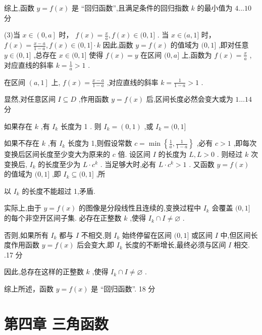 \documentclass[10pt]{article}
\begin{document}
综上,函数 \(y = f\left( x\right)\) 是 “回归函数”,且满足条件的回归指数 \(k\) 的最小值为 \(4\ldots {10}\) 分

(3)当 \(x \in  \left( {0,a}\right\rbrack\) 时， \(f\left( x\right)  = \frac{x}{a},f\left( x\right)  \in  (0,1\rbrack\) . 当 \(x \in  (a,1\rbrack\) 时， \(f\left( x\right)  = \frac{x - a}{1 - a},f\left( x\right)  \in  (0,1\rbrack  \cdot  k\) 因此,函数 \(y = f\left( x\right)\) 的值域为 \((0,1\rbrack\) ,即对任意 \(y \in  (0,1\rbrack\) ,总存在 \(x \in  (0,1\rbrack\) 使得 \(f\left( x\right)  = y\) 在区间 \((0,a\rbrack\) 上,函数为 \(f\left( x\right)  = \frac{x}{a}\) ,对应直线的斜率 \(k = \frac{1}{a} > 1\) .

在区间 \(\left( {a,1}\right\rbrack\) 上, \(f\left( x\right)  = \frac{x - a}{1 - a}\) ,对应直线的斜率 \(k = \frac{1}{1 - a} > 1\) .

显然,对任意区间 \(I \subseteq  D\) ,作用函数 \(y = f\left( x\right)\) 后,区间长度必然会变大或为 \(1\ldots {14}\) 分

如果存在 \(k\) ,有 \({I}_{k}\) 长度为 1 . 则 \({I}_{k} = \left( {0,1}\right)\) ,或 \({I}_{k} = (0,1\rbrack\)

如果不存在 \(k\) ,有 \({I}_{k}\) 长度为 1,则假设常数 \(c = \min \left\{  {\frac{1}{a},\frac{1}{1 - a}}\right\}\) ,必有 \(c > 1\) ,即每次变换后区间长度至少变大为原来的 \(c\) 倍. 设区间 \(I\) 的长度为 \(L,L > 0\) . 则经过 \(k\) 次变换后, \({I}_{k}\) 的长度至少为 \(L \cdot  {c}^{k}\) . 当足够大时,必有 \(L \cdot  {c}^{k} > 1\) . 又函数 \(y = f\left( x\right)\) 的值域为 \((0,1\rbrack\) ,即 \({I}_{k} \subseteq  (0,1\rbrack\) ,所

以 \({I}_{k}\) 的长度不能超过 1,矛盾.

实际上,由于 \(y = f\left( x\right)\) 的图像是分段线性且连续的,变换过程中 \({I}_{k}\) 会覆盖 \((0,1\rbrack\) 的每个非空开区间子集. 必存在正整数 \(k\) ,使得 \({I}_{k} \cap  I \neq  \varnothing\) .

否则,如果所有 \({I}_{k}\) 都与 \(I\) 不相交,则 \({I}_{k}\) 始终停留在区间 \((0,1\rbrack\) 或区间 \(I\) 中,但区间长度作用函数 \(y = f\left( x\right)\) 后会变大,即 \({I}_{k}\) 长度的不断增长,最终必须与区间 \(I\) 相交. .17 分

因此,总存在这样的正整数 \(k\) ,使得 \({I}_{k} \cap  I \neq  \varnothing\) .

综上所述，函数 \(y = f\left( x\right)\) 是 “回归函数”. 18 分

\section*{第四章 三角函数}
\end{document}
